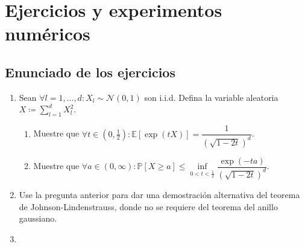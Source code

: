 
\chapter{Ejercicios y experimentos numéricos}

\section{Enunciado de los ejercicios}

\begin{enumerate}
	\item

	      Sean $\forall l=1,\dotsc,d:X_{l}\sim\mathcal{N}\left(0,1\right)$ son i.i.d.
	      Defina la variable aleatoria $X\coloneqq\sum\limits_{l=1}^{d}X^{2}_{l}$.

	      \begin{enumerate}
		      \item

		            Muestre que
		            \begin{math}
			            \forall t\in\left(0,\frac{1}{2}\right):
			            \mathbb{E}\left[\exp\left(tX\right)\right]=
			            \dfrac{1}{{\left(\sqrt{1-2t}\right)}^{d}}
		            \end{math}.

		      \item

		            Muestre que
		            \begin{math}
			            \forall a\in\left(0,\infty\right):
			            \mathbb{P}\left[X\geq a\right]\leq
			            \inf\limits_{0<t<\frac{1}{2}}
			            \dfrac{\exp\left(-ta\right)}{{\left(\sqrt{1-2t}\right)}^{d}}
		            \end{math}.
	      \end{enumerate}

	\item

	      Use la pregunta anterior para dar una demostración alternativa del teorema
	      de Johnson-Lindenstrauss, donde no se requiere del teorema del anillo
	      gaussiano.

	\item


\end{enumerate}
